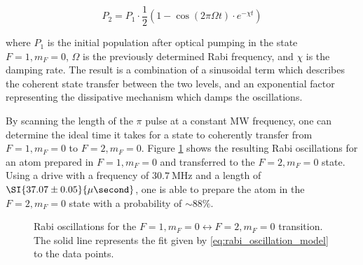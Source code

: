 \begin{equation}
	P_2=P_1\cdot\frac{1}{2}(1-\cos\left(2\pi\Omega t\right)\cdot e^{-\chi t})
	\label{eq:rabi_oscillation_model}
\end{equation}

where $P_1$ is the initial population after optical pumping in the state $F=1,m_F=0$, $\Omega$ is the previously determined Rabi frequency, and $\chi$ is the damping rate. The result is a combination of a sinusoidal term which describes the coherent state transfer between the two levels, and an exponential factor representing the dissipative mechanism which damps the oscillations.

By scanning the length of the $\pi$ pulse at a constant MW frequency, one can determine the ideal time it takes for a state to coherently transfer from $F=1,m_F=0$ to $F=2,m_F=0$. Figure \ref{fig:rabi_flop} shows the resulting Rabi oscillations for an atom prepared in $F=1,m_F=0$ and transferred to the $F=2,m_F=0$ state. Using a drive with a frequency of $\SI{30.7}{\mega\hertz}$ and a length of $\SI{37.07\pm0.05}{\mu\second}$, one is able to prepare the atom in the $F=2,m_F=0$ state with a probability of $\sim88\%$.

\begin{figure}[htpb]
	\centering
	
	\caption{Rabi oscillations for the $F=1,m_F=0\leftrightarrow F=2,m_F=0$ transition. The solid line represents the fit given by \eqref{eq:rabi_oscillation_model} to the data points.}
	\label{fig:rabi_flop}
\end{figure}
